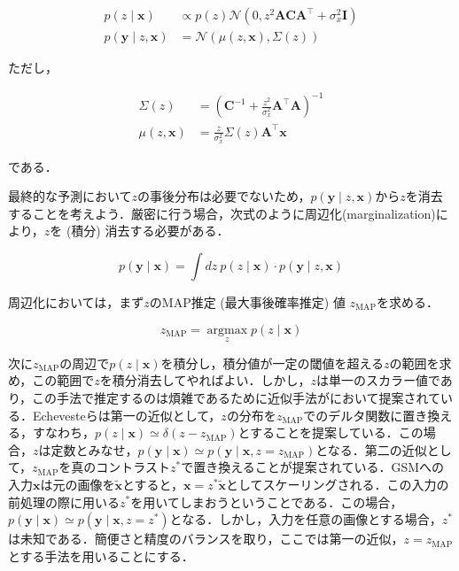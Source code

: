 \begin{align}
p(z \mid \mathbf{x}) &\propto p(z) \mathcal{N}\left(0, z^{2} \mathbf{A C A}^{\top}+\sigma_{x}^{2} \mathbf{I}\right)\\
p(\mathbf{y} \mid z, \mathbf{x})& = \mathcal{N}\left(\mu(z, \mathbf{x}), \Sigma(z)\right)
\end{align}


ただし，


\begin{align}
\Sigma(z)&=\left(\mathbf{C}^{-1}+\frac{z^{2}}{\sigma_{x}^{2}} \mathbf{A}^{\top} \mathbf{A}\right)^{-1}\\
\mu(z, \mathbf{x})&=\frac{z}{\sigma_{x}^{2}} \Sigma(z) \mathbf{A}^{\top} \mathbf{x}
\end{align}


である．

最終的な予測において$z$の事後分布は必要でないため，$p(\mathbf{y} \mid z, \mathbf{x})$から$z$を消去することを考えよう．厳密に行う場合，次式のように周辺化(marginalization)により，$z$を (積分) 消去する必要がある．


\begin{equation}
p(\mathbf{y} \mid \mathbf{x}) = \int dz\ p(z\mid \mathbf{x})\cdot p(\mathbf{y} \mid z, \mathbf{x})
\end{equation}


周辺化においては，まず$z$のMAP推定 (最大事後確率推定) 値 $z_{\mathrm{MAP}}$を求める．


\begin{equation}
z_{\mathrm{MAP}} = \underset{z}{\operatorname{argmax}} p(z\mid \mathbf{x})
\end{equation}


次に$z_{\mathrm{MAP}}$の周辺で$p(z\mid \mathbf{x})$を積分し，積分値が一定の閾値を超える$z$の範囲を求め，この範囲で$z$を積分消去してやればよい．しかし，$z$は単一のスカラー値であり，この手法で推定するのは煩雑であるために近似手法が\cite{Echeveste2017-wu}において提案されている．Echevesteらは第一の近似として，$z$の分布を$z_{\mathrm{MAP}}$でのデルタ関数に置き換える，すなわち，$p(z\mid \mathbf{x})\simeq \delta (z-z_{\mathrm{MAP}})$とすることを提案している．この場合，$z$は定数とみなせ，$p(\mathbf{y} \mid \mathbf{x})\simeq p(\mathbf{y} \mid \mathbf{x}, z=z_{\mathrm{MAP}})$となる．第二の近似として，$z_{\mathrm{MAP}}$を真のコントラスト$z^*$で置き換えることが提案されている．GSMへの入力$\mathbf{x}$は元の画像を$\mathbf{\tilde x}$とすると，$\mathbf{x}=z^* \mathbf{\tilde x}$としてスケーリングされる．この入力の前処理の際に用いる$z^*$を用いてしまおうということである．この場合，$p(\mathbf{y} \mid \mathbf{x})\simeq p(\mathbf{y} \mid \mathbf{x}, z=z^*)$となる．しかし，入力を任意の画像とする場合，$z^*$は未知である．簡便さと精度のバランスを取り，ここでは第一の近似，$z=z_{\mathrm{MAP}}$とする手法を用いることにする．


